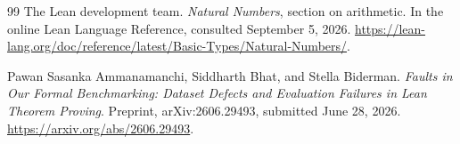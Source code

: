 \documentclass[11pt,a4paper]{article}
\theoremstyle{definition}
\theoremstyle{remark}
\numberwithin{equation}{section}
\begin{document}
\begin{thebibliography}{99}
The Lean development team.
\emph{Natural Numbers}, section on arithmetic.
In the online Lean Language Reference, consulted September 5, 2026.
\url{https://lean-lang.org/doc/reference/latest/Basic-Types/Natural-Numbers/}.

Pawan Sasanka Ammanamanchi, Siddharth Bhat, and Stella Biderman.
\emph{Faults in Our Formal Benchmarking: Dataset Defects and Evaluation Failures in Lean Theorem Proving}.
Preprint, arXiv:2606.29493, submitted June 28, 2026.
\url{https://arxiv.org/abs/2606.29493}.

\end{thebibliography}
\end{document}
